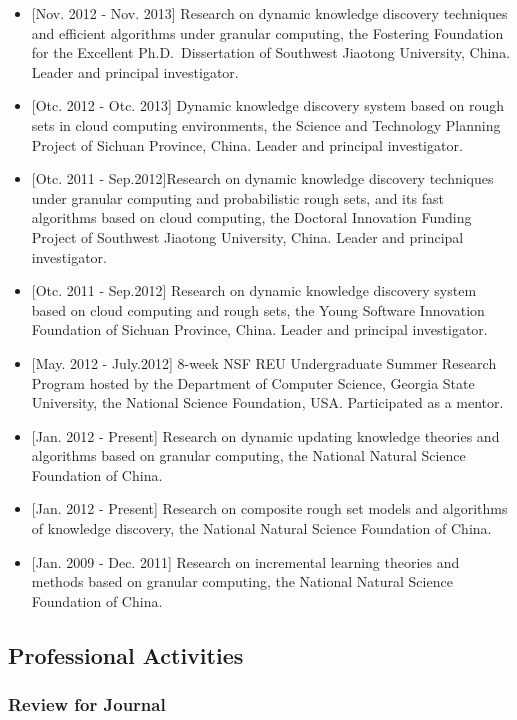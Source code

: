 \documentclass[]{article}
\begin{document}
\begin{itemize}
\item
  {[}Nov. 2012 - Nov. 2013{]} Research on dynamic knowledge discovery
  techniques and efficient algorithms under granular computing, the
  Fostering Foundation for the Excellent Ph.D.~Dissertation of Southwest
  Jiaotong University, China. Leader and principal investigator.
\item
  {[}Otc. 2012 - Otc. 2013{]} Dynamic knowledge discovery system based
  on rough sets in cloud computing environments, the Science and
  Technology Planning Project of Sichuan Province, China. Leader and
  principal investigator.
\item
  {[}Otc. 2011 - Sep.2012{]}Research on dynamic knowledge discovery
  techniques under granular computing and probabilistic rough sets, and
  its fast algorithms based on cloud computing, the Doctoral Innovation
  Funding Project of Southwest Jiaotong University, China. Leader and
  principal investigator.
\item
  {[}Otc. 2011 - Sep.2012{]} Research on dynamic knowledge discovery
  system based on cloud computing and rough sets, the Young Software
  Innovation Foundation of Sichuan Province, China. Leader and principal
  investigator.
\item
  {[}May. 2012 - July.2012{]} 8-week NSF REU Undergraduate Summer
  Research Program hosted by the Department of Computer Science, Georgia
  State University, the National Science Foundation, USA. Participated
  as a mentor.
\item
  {[}Jan. 2012 - Present{]} Research on dynamic updating knowledge
  theories and algorithms based on granular computing, the National
  Natural Science Foundation of China.
\item
  {[}Jan. 2012 - Present{]} Research on composite rough set models and
  algorithms of knowledge discovery, the National Natural Science
  Foundation of China.
\item
  {[}Jan. 2009 - Dec. 2011{]} Research on incremental learning theories
  and methods based on granular computing, the National Natural Science
  Foundation of China.
\end{itemize}

\subsection{Professional Activities}\label{professional-activities}

\subsubsection{Review for Journal}\label{review-for-journal}
\end{document}
